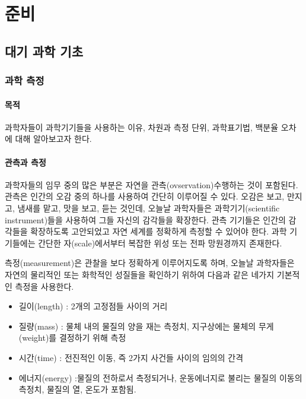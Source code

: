 \part{준비}

\usechapterimagetrue
{} %
\chapter{대기 과학 기초}


\section{과학 측정}

\subsection{목적}

과학자들이 과학기기들을 사용하는 이유, 차원과 측정 단위, 과학표기법, 백분율 오차에 대해 알아보고자 한다.

\subsection{관측과 측정}

과학자들의 임무 중의 많은 부분은 자연을 관측(ovservation)\을 수행하는 것이 포함된다. 관측은 인간의 오감 중의 하나를 사용하여 간단히 이루어질 수 있다. 오감은 보고, 만지고, 냄새를 맡고, 맛을 보고, 듣는 것인데, 오늘날 과학자들은 과학기기(scientific instrument)들을 사용하여 그들 자신의 감각들을 확장한다. 
관측 기기들은 인간의 감각들을 확장하도록 고안되었고 자연 세계를 정확하게 측정할 수 있어야 한다. 과학 기기들에는 간단한 자(scale)에서부터 복잡한 위성 또는 전파 망원경까지 존재한다. 

측정(measurement)은 관찰을 보다 정확하게 이루어지도록 하며, 오늘날 과학자들은 자연의 물리적인 또는 화학적인 성질들을 확인하기 위하여 다음과 같은 네가지 기본적인 측정을 사용한다.
\begin{itemize}
	\item 길이(length) : 2개의 고정점들 사이의 거리
	\item 질량(mass) : 물체 내의 물질의 양을 재는 측정치, 지구상에는 물체의 무게(weight)를 결정하기 위해 측정
	\item 시간(time) : 전진적인 이동, 즉 2가지 사건들 사이의 임의의 간격
	\item 에너지(energy) :물질의 전하로서 측정되거나, 운동에너지로 불리는 물질의 이동의 측정치, 물질의 열, 온도가 포함됨.
\end{itemize}

